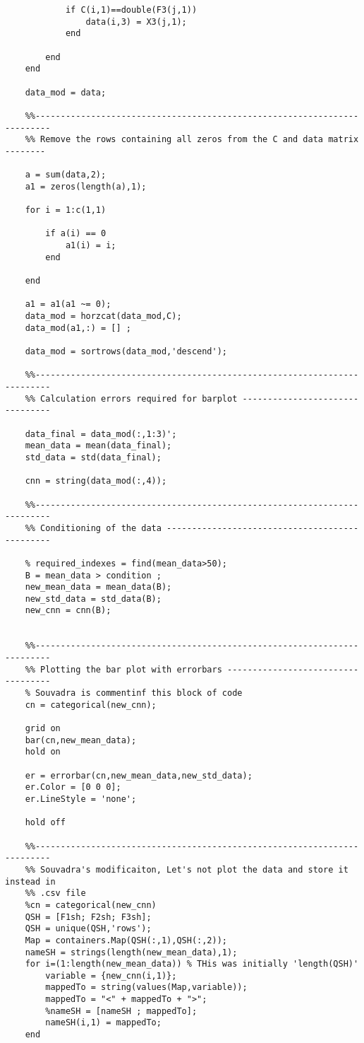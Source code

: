 \documentclass{article}
\begin{document}
\begin{verbatim}
            if C(i,1)==double(F3(j,1))
                data(i,3) = X3(j,1);
            end
    
        end
    end
    
    data_mod = data;
    
    %%-------------------------------------------------------------------------
    %% Remove the rows containing all zeros from the C and data matrix --------
    
    a = sum(data,2);
    a1 = zeros(length(a),1);
    
    for i = 1:c(1,1)
       
        if a(i) == 0
            a1(i) = i;        
        end
        
    end
    
    a1 = a1(a1 ~= 0);
    data_mod = horzcat(data_mod,C);
    data_mod(a1,:) = [] ;
    
    data_mod = sortrows(data_mod,'descend');
    
    %%-------------------------------------------------------------------------
    %% Calculation errors required for barplot --------------------------------
    
    data_final = data_mod(:,1:3)';
    mean_data = mean(data_final);
    std_data = std(data_final);
    
    cnn = string(data_mod(:,4));
    
    %%-------------------------------------------------------------------------
    %% Conditioning of the data -----------------------------------------------
    
    % required_indexes = find(mean_data>50);
    B = mean_data > condition ;
    new_mean_data = mean_data(B);
    new_std_data = std_data(B);
    new_cnn = cnn(B);
    
    
    %%-------------------------------------------------------------------------
    %% Plotting the bar plot with errorbars -----------------------------------
    % Souvadra is commentinf this block of code
    cn = categorical(new_cnn);
    
    grid on
    bar(cn,new_mean_data);
    hold on
    
    er = errorbar(cn,new_mean_data,new_std_data);
    er.Color = [0 0 0];                            
    er.LineStyle = 'none';
    
    hold off
    
    %%-------------------------------------------------------------------------
    %% Souvadra's modificaiton, Let's not plot the data and store it instead in
    %% .csv file 
    %cn = categorical(new_cnn)
    QSH = [F1sh; F2sh; F3sh];
    QSH = unique(QSH,'rows');
    Map = containers.Map(QSH(:,1),QSH(:,2));
    nameSH = strings(length(new_mean_data),1);
    for i=(1:length(new_mean_data)) % THis was initially 'length(QSH)'
        variable = {new_cnn(i,1)};
        mappedTo = string(values(Map,variable));
        mappedTo = "<" + mappedTo + ">";
        %nameSH = [nameSH ; mappedTo];
        nameSH(i,1) = mappedTo;
    end
    

\end{verbatim}
\end{document}
